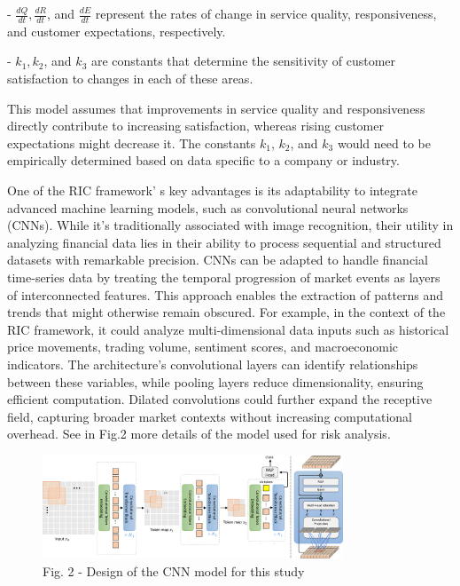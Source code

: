 \begin{multicols}{2}
- \(\frac{dQ}{dt},\frac{dR}{dt}\), and \(\frac{dE}{dt}\) represent the
rates of change in service quality, responsiveness, and customer
expectations, respectively.

- \(k_{1},k_{2}\), and \(k_{3}\) are constants that determine the
sensitivity of customer satisfaction to changes in each of these
areas.

This model assumes that improvements in service quality and
responsiveness directly contribute to increasing satisfaction, whereas
rising customer expectations might decrease it. The constants \(k_{1}\),
\(k_{2}\), and \(k_{3}\) would need to be empirically determined based
on data specific to a company or industry.

One of the RIC framework' s key advantages is its
adaptability to integrate advanced machine learning models, such as
convolutional neural networks (CNNs). While it's traditionally
associated with image recognition, their utility in analyzing financial
data lies in their ability to process sequential and structured datasets
with remarkable precision. CNNs can be adapted to handle financial
time-series data by treating the temporal progression of market events
as layers of interconnected features. This approach enables the
extraction of patterns and trends that might otherwise remain obscured.
For example, in the context of the RIC framework, it could analyze
multi-dimensional data inputs such as historical price movements,
trading volume, sentiment scores, and macroeconomic indicators. The
architecture's convolutional layers can identify relationships between
these variables, while pooling layers reduce dimensionality, ensuring
efficient computation. Dilated convolutions could further expand the
receptive field, capturing broader market contexts without increasing
computational overhead. See in Fig.2 more details of the model used for
risk analysis.
\end{multicols}

\begin{figure}[H]
	\centering
	\includegraphics[width=0.8\textwidth]{media/ict2/image10}
	\caption*{Fig. 2 - Design of the CNN model for this study}
\end{figure}

